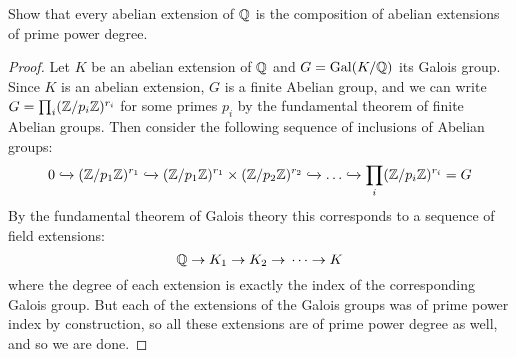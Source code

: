 \documentclass[11pt]{article}
\DeclareMathOperator{\Gal}{Gal}
\begin{document}
Show that every abelian extension of $\mathbb{Q}$ is the composition of abelian extensions of prime power degree.

\begin{proof}
  Let $K$ be an abelian extension of $\mathbb{Q}$ and $G = \Gal(K/\Q)$ its Galois group.
  Since $K$ is an abelian extension, $G$ is a finite Abelian group, and we can write $G = \prod_i (\mathbb{Z}/p_i\mathbb{Z})^{r_i}$ for some primes $p_i$ by the fundamental theorem of finite Abelian groups.
  Then consider the following sequence of inclusions of Abelian groups:
  \begin{equation*}
    0 \xhookrightarrow{} (\mathbb{Z}/p_1\mathbb{Z})^{r_1}
    \xhookrightarrow{} (\mathbb{Z}/p_1\mathbb{Z})^{r_1} \times (\mathbb{Z}/p_2\mathbb{Z})^{r_2}
    \xhookrightarrow{} \dots \xhookrightarrow{}
    \prod_i (\mathbb{Z}/p_i\mathbb{Z})^{r_i} = G    
  \end{equation*}
  By the fundamental theorem of Galois theory this corresponds to a sequence of field extensions:
  \begin{equation*}
    \mathbb{Q} \rightarrow{} K_1 \rightarrow{} K_2 \rightarrow{} \dots
    \rightarrow{} K
  \end{equation*}
  where the degree of each extension is exactly the index of the corresponding Galois group.
  But each of the extensions of the Galois groups was of prime power index by construction, so all these extensions are of prime power degree as well, and so we are done.
\end{proof}
\end{document}
